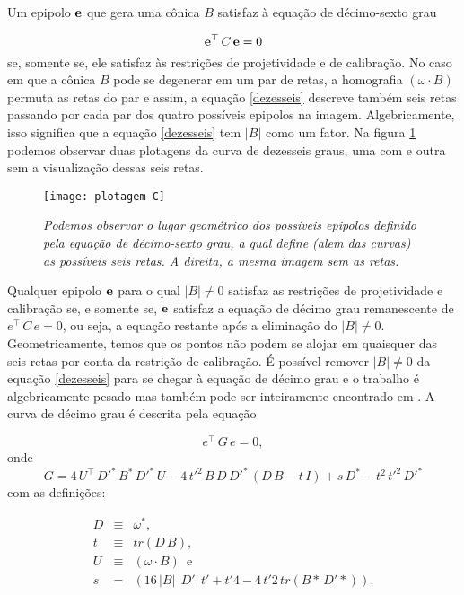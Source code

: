 Um epipolo ${\bf e}$ que gera uma cônica $B$ satisfaz à equação de décimo-sexto grau

\begin{equation}
{\bf e}^\top\,C\,{\bf e} = 0
\label{dezesseis}
\end{equation}
se, somente se, ele satisfaz às restrições de projetividade e de calibração. No caso em que a cônica $B$ pode se degenerar em um par de retas, a homografia $(\omega \cdot B)$ permuta as retas do par e assim, a equação \ref{dezesseis} descreve também seis retas passando por cada par dos quatro possíveis epipolos na imagem. Algebricamente, isso significa que a equação \ref{dezesseis} tem $|B|$ como um fator. Na figura \ref{plot-C} podemos observar duas plotagens da curva de dezesseis graus, uma com e outra sem a visualização dessas seis retas.

\begin{figure}[!htb]
\centering
\texttt{[image: plotagem-C]}
\caption{\textit{Podemos observar o lugar geométrico dos possíveis epipolos definido pela equação de décimo-sexto grau, a qual define (alem das curvas) as possíveis seis retas. A direita, a mesma imagem sem as retas.}}
\label{plot-C}
\end{figure}

Qualquer epipolo ${\bf e}$ para o qual $|B|\ne0$ satisfaz as restrições de projetividade e calibração se, e somente se, ${\bf e}$ satisfaz a equação de décimo grau remanescente de $e^\top\,C\,e=0$, ou seja, a equação restante após a eliminação do $|B|\ne0$. Geometricamente, temos que os pontos não podem se alojar em quaisquer das seis retas por conta da restrição de calibração. É possível remover $|B|\ne0$ da equação \ref{dezesseis} para se chegar à equação de décimo grau e o trabalho é algebricamente pesado mas também pode ser inteiramente encontrado em \cite{kneebone}. A curva de décimo grau é descrita pela equação

\begin{equation}
e^\top\,G\,e=0,
\label{dez}
\end{equation}
onde 
\begin{equation}
G=4\,U^\top\,D'^*\,B^*\,D'^*\,U-4\,t'^2\,B\,D\,D'^*\,(D\,B-t\,I)+s\,D^*-t^2\,t'^2\,D'^*
\label{conica-G}
\end{equation}
com as definições:

\begin{equation}
\begin{array}{rcl}
D&\equiv&\omega^*,\\
t&\equiv&tr(D\,B),\\
U&\equiv&(\omega \cdot B)\,\,\, \text{e}\\
s&=&(16\,|B|\,|D'|\,t'+t'4-4\,t'2\,tr(B*\,D'*)).
\end{array}
\end{equation}

